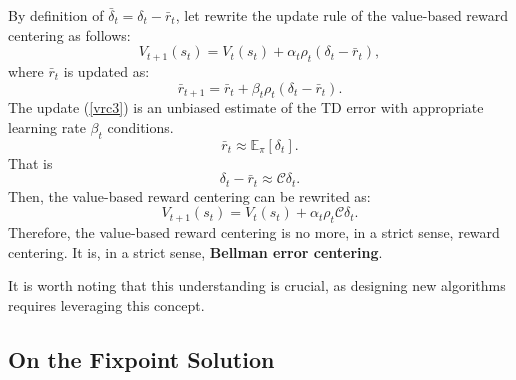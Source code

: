 By definition of $\bar{\delta}_t=\delta_t-\bar{r}_{t}$,
let rewrite the update rule of the value-based reward centering as follows:
\begin{equation}
V_{t+1}(s_t)=V_{t}(s_t)+\alpha_t \rho_t (\delta_t-\bar{r}_{t}),
\end{equation}
where $\bar{r}_{t}$ is updated as:
\begin{equation}
\bar{r}_{t+1}=\bar{r}_{t}+\beta_t \rho_t(\delta_t-\bar{r}_{t}).
\label{vrc3}
\end{equation}
The update (\ref{vrc3}) is an unbiased estimate of the TD error
with  appropriate learning rate $\beta_t$ conditions.
\begin{equation}
\bar{r}_{t}\approx \mathbb{E}_{\pi}[\delta_t].
\end{equation}
That is 
\begin{equation}
\delta_t-\bar{r}_{t}\approx \mathcal{C}\delta_t.
\end{equation}
Then, the value-based reward centering can be rewrited as:
\begin{equation}
V_{t+1}(s_t)=V_{t}(s_t)+\alpha_t \rho_t \mathcal{C}\delta_t.
\label{tdcentering}
\end{equation}
Therefore, the value-based reward centering is no more,
 in a strict sense, reward centering.
It is, in a strict sense, \textbf{Bellman error centering}.

It is worth noting that this understanding is crucial, 
as designing new algorithms requires leveraging this concept.


\subsection{On the Fixpoint Solution}

